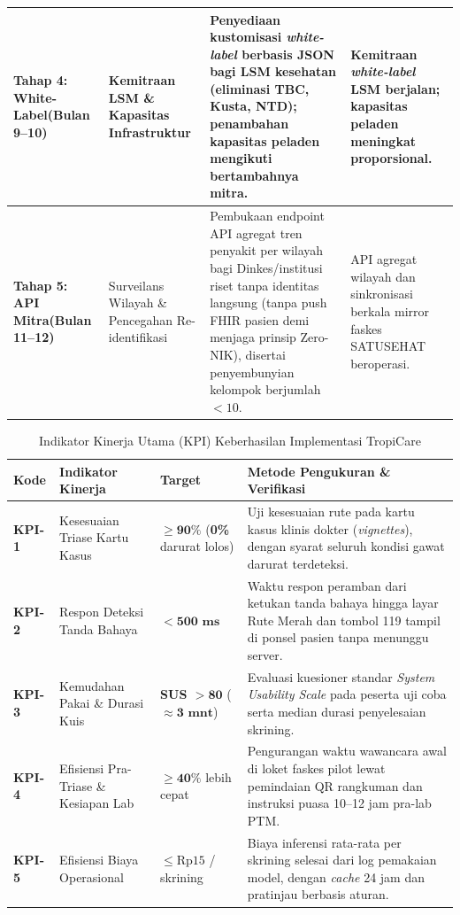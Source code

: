 \begin{table}[H]
\begin{tabularx}{\textwidth}{p{2.4cm} p{2.9cm} X p{3.7cm}}
\midrule
\textbf{Tahap 4: White-Label\newline(Bulan 9--10)} & Kemitraan LSM \& Kapasitas Infrastruktur & Penyediaan kustomisasi \textit{white-label} berbasis JSON bagi LSM kesehatan (eliminasi TBC, Kusta, NTD); penambahan kapasitas peladen mengikuti bertambahnya mitra. & Kemitraan \textit{white-label} LSM berjalan; kapasitas peladen meningkat proporsional. \\
\midrule
\textbf{Tahap 5: API Mitra\newline(Bulan 11--12)} & Surveilans Wilayah \& Pencegahan Re-identifikasi & Pembukaan endpoint API agregat tren penyakit per wilayah bagi Dinkes/institusi riset tanpa identitas langsung (tanpa push FHIR pasien demi menjaga prinsip Zero-NIK), disertai penyembunyian kelompok berjumlah $<10$. & API agregat wilayah dan sinkronisasi berkala mirror faskes SATUSEHAT beroperasi. \\
\bottomrule
\end{tabularx}
\end{table}

\begin{table}[H]
\centering
\footnotesize
\caption{Indikator Kinerja Utama (KPI) Keberhasilan Implementasi TropiCare}\label{tab:kpi}
\vspace{3pt}
\begin{tabularx}{\textwidth}{p{1.3cm} p{4.0cm} p{2.3cm} X}
\toprule
\textbf{Kode} & \textbf{Indikator Kinerja} & \textbf{Target} & \textbf{Metode Pengukuran \& Verifikasi} \\
\midrule
\textbf{KPI-1} & Kesesuaian Triase Kartu Kasus & $\mathbf{\ge 90\%}$ (\textbf{0\%} darurat lolos) & Uji kesesuaian rute pada kartu kasus klinis dokter (\textit{vignettes}), dengan syarat seluruh kondisi gawat darurat terdeteksi. \\
\midrule
\textbf{KPI-2} & Respon Deteksi Tanda Bahaya & $\mathbf{<500\text{ ms}}$ & Waktu respon peramban dari ketukan tanda bahaya hingga layar Rute Merah dan tombol 119 tampil di ponsel pasien tanpa menunggu server. \\
\midrule
\textbf{KPI-3} & Kemudahan Pakai \& Durasi Kuis & \textbf{SUS $\mathbf{>80}$} ($\mathbf{\approx 3\text{ mnt}}$) & Evaluasi kuesioner standar \textit{System Usability Scale} pada peserta uji coba serta median durasi penyelesaian skrining. \\
\midrule
\textbf{KPI-4} & Efisiensi Pra-Triase \& Kesiapan Lab & $\mathbf{\ge 40\%}$ lebih cepat & Pengurangan waktu wawancara awal di loket faskes pilot lewat pemindaian QR rangkuman dan instruksi puasa 10--12 jam pra-lab PTM. \\
\midrule
\textbf{KPI-5} & Efisiensi Biaya Operasional & $\le \text{Rp}15$ / skrining & Biaya inferensi rata-rata per skrining selesai dari log pemakaian model, dengan \textit{cache} 24 jam dan pratinjau berbasis aturan. \\
\bottomrule
\end{tabularx}
\end{table}
